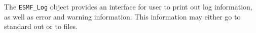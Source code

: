 %


The {\tt ESMF\_Log} object provides an interface for user to print out log
information, as well as error and warning information.   This information may 
either go to standard out or to files.
